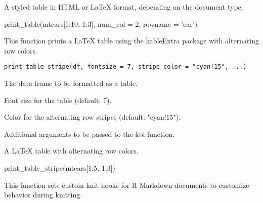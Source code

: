 \documentclass[a4paper]{book}
\begin{document}
%
\begin{Value}
A styled table in HTML or LaTeX format, depending on the document type.
\end{Value}
%
\begin{Examples}
\begin{ExampleCode}
print_table(mtcars[1:10, 1:3], num_col = 2, rowname = 'car')

\end{ExampleCode}
\end{Examples}
%
\begin{Description}
This function prints a LaTeX table using the kableExtra package with alternating row colors.
\end{Description}
%
\begin{Usage}
\begin{verbatim}
print_table_stripe(df, fontsize = 7, stripe_color = "cyan!15", ...)
\end{verbatim}
\end{Usage}
%
\begin{Arguments}
\begin{ldescription}
\item[\code{df}] The data frame to be formatted as a table.

\item[\code{fontsize}] Font size for the table (default: 7).

\item[\code{stripe\_color}] Color for the alternating row stripes (default: "cyan!15").

\item[\code{...}] Additional arguments to be passed to the kbl function.
\end{ldescription}
\end{Arguments}
%
\begin{Value}
A LaTeX table with alternating row colors.
\end{Value}
%
\begin{Examples}
\begin{ExampleCode}
print_table_stripe(mtcars[1:5, 1:3])

\end{ExampleCode}
\end{Examples}
%
\begin{Description}
This function sets custom knit hooks for R Markdown documents to customize behavior during knitting.
\end{Description}
\end{document}
